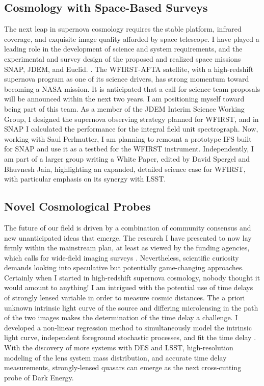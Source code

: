\documentclass{article}
\begin{document}
\subsection{Cosmology with Space-Based Surveys}
The next leap in supernova cosmology requires the stable platform, infrared coverage, and exquisite image
quality afforded by space telescope.  I have played a leading role in the development
of science and system requirements, and the experimental and survey design of the proposed
and realized space missions SNAP, JDEM, and Euclid.
\cite{2006PASP..118..205D, 2011PASP..123..470S, 2013Fourspring, 2014arXiv1409.8562A}.
The WFIRST-AFTA satellite, with a high-redshift supernova program as one of its science 
drivers, has strong momentum toward becoming a NASA mission.  It is anticipated that a call for science team
proposals will be announced within the next two years.  I am positioning myself toward being part of
this team.  As a member of the JDEM Interim Science Working Group, I designed the
supernova observing strategy planned for WFIRST, and in SNAP I calculated the performance for the integral
field unit spectrograph.  Now, working with Saul Perlmutter,
I am planning to remount a prototype IFS built for SNAP and use it as a testbed for
the WFIRST instrument.  Independently, I am part of a larger group writing a White Paper, edited by David Spergel and Bhuvnesh
Jain, highlighting an expanded, detailed science case for WFIRST, with particular emphasis
on its synergy with LSST.

\subsection{Novel Cosmological Probes}
The future of our field is driven by a combination of community consensus and new unanticipated
ideas that emerge.  The research I have presented to now lay firmly within the
mainstream plan, at least as viewed by the funding agencies, which calls for wide-field imaging surveys
\cite{2013arXiv1309.5386D,2013arXiv1309.5382K}.
Nevertheless, scientific curiosity demands looking into speculative but potentially game-changing
approaches.  Certainly when I started in high-redshift supernova cosmology, nobody thought
it would amount to anything!  I am intrigued with the potential use of time delays of strongly lensed variable in order
to measure cosmic distances.  The a priori unknown intrinsic light curve of the source and differing microlensing
in the path of the two images makes the determination of the time delay a challenge.  I developed a
non-linear regression method to simultaneously model the intrinsic light curve, independent foreground
stochastic processes, and fit the time delay \cite{2013PhRvD..87l3512H}.  With the discovery of more 
systems with DES and LSST, high-resolution modeling of the lens system mass distribution, and accurate
time delay measurements, strongly-lensed
quasars can emerge as the next cross-cutting probe of Dark Energy.
\end{document}
